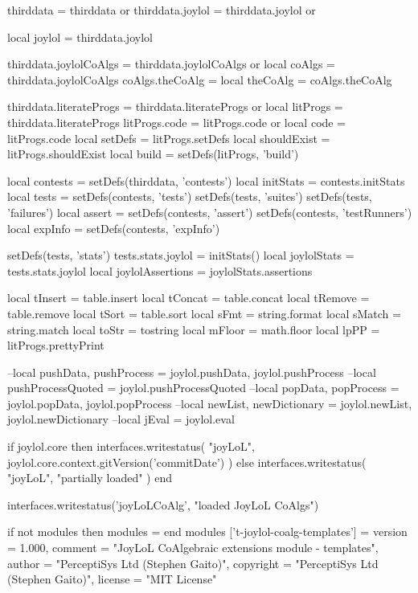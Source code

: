 thirddata         = thirddata        or {}
thirddata.joylol  = thirddata.joylol or {}

local joylol      = thirddata.joylol

thirddata.joylolCoAlgs = thirddata.joylolCoAlgs or {}
local coAlgs      = thirddata.joylolCoAlgs
coAlgs.theCoAlg   = {}
local theCoAlg    = coAlgs.theCoAlg

thirddata.literateProgs = thirddata.literateProgs or {}
local litProgs    = thirddata.literateProgs
litProgs.code     = litProgs.code or {}
local code        = litProgs.code
local setDefs     = litProgs.setDefs
local shouldExist = litProgs.shouldExist
local build       = setDefs(litProgs, 'build')

local contests    = setDefs(thirddata, 'contests')
local initStats   = contests.initStats
local tests       = setDefs(contests, 'tests')
                    setDefs(tests, 'suites')
                    setDefs(tests, 'failures')
local assert      = setDefs(contests, 'assert')
                    setDefs(contests, 'testRunners')
local expInfo     = setDefs(contests, 'expInfo')

                         setDefs(tests, 'stats')
tests.stats.joylol     = initStats()
local joylolStats      = tests.stats.joylol
local joylolAssertions = joylolStats.assertions

local tInsert = table.insert
local tConcat = table.concat
local tRemove = table.remove
local tSort   = table.sort
local sFmt    = string.format
local sMatch  = string.match
local toStr   = tostring
local mFloor  = math.floor
local lpPP    = litProgs.prettyPrint

--local pushData, pushProcess = joylol.pushData, joylol.pushProcess
--local pushProcessQuoted = joylol.pushProcessQuoted
--local popData, popProcess   = joylol.popData, joylol.popProcess
--local newList, newDictionary = joylol.newList, joylol.newDictionary
--local jEval = joylol.eval

if joylol.core then
  interfaces.writestatus(
    "joyLoL",
    joylol.core.context.gitVersion('commitDate')
  )
else
  interfaces.writestatus(
    "joyLoL",
    "partially loaded"
  )
end

interfaces.writestatus('joyLoLCoAlg', "loaded JoyLoL CoAlgs")
\stopLuaCode

\startLuaTemplate
if not modules then modules = { } end modules ['t-joylol-coalg-templates'] = {
    version   = 1.000,
    comment   = "JoyLoL CoAlgebraic extensions module - templates",
    author    = "PerceptiSys Ltd (Stephen Gaito)",
    copyright = "PerceptiSys Ltd (Stephen Gaito)",
    license   = "MIT License"
}

